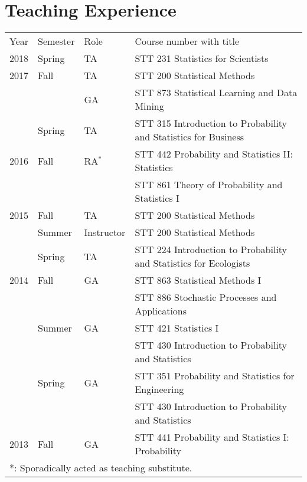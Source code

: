 \documentclass[a4paper,10pt,dvipdfmx]{article}
\begin{document}
\section*{Teaching Experience}
\begin{small}
  \begin{tabular}{llll}
    Year  & Semester& Role       & Course number with title\\
    2018  & Spring  & TA         & STT 231 Statistics for Scientists\\
    2017  & Fall	  & TA				 & STT 200 Statistical Methods\\
          &			    & GA				 & STT 873 Statistical Learning and Data Mining\\
          & Spring  & TA				 & STT 315 Introduction to Probability and Statistics for Business\\
    2016  & Fall    & RA$^{*}$   & STT 442 Probability and Statistics II: Statistics\\
          &         &            & STT 861 Theory of Probability and Statistics I\\
    2015  & Fall	  & TA				 & STT 200 Statistical Methods\\
          & Summer  & Instructor & STT 200 Statistical Methods\\
          & Spring  & TA				 & STT 224 Introduction to Probability and Statistics for Ecologists\\
    2014  & Fall	  & GA				 & STT 863 Statistical Methods I\\
          &			    &						 & STT 886 Stochastic Processes and Applications\\
          & Summer  & GA				 & STT 421 Statistics I\\
          &			    &						 & STT 430 Introduction to Probability and Statistics\\
          & Spring  & GA				 & STT 351 Probability and Statistics for Engineering\\
          &			    &						 & STT 430 Introduction to Probability and Statistics\\
    2013  & Fall	  & GA				 & STT 441 Probability and Statistics I: Probability\\
    \multicolumn{4}{l}{$*$: Sporadically acted as teaching substitute.}
  \end{tabular}
\end{small}
\end{document}
